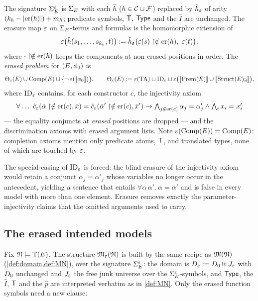 \begin{definition}
  \label{def:erased-translation}
  The signature $\Sigma_{E}^{\varepsilon}$ is $\Sigma_{E}$ with each $\hat h$
  ($h \in \mathcal{C} \cup \mathcal{F}$) replaced by $\hat h_{\varepsilon}$ of arity
  $(k_h - |\mathrm{er}(h)|) + m_h$; predicate symbols, $\mathsf{T}$, $\mathsf{Type}$ and the
  $\hat I$ are unchanged.  The erasure map $\varepsilon$ on $\Sigma_{E}$-terms and
  formulas is the homomorphic extension of
  \[
    \varepsilon\bigl(\hat h(s_1,\dots,s_{k_h}, \bar{t})\bigr) \mathrel{:=}
    \hat h_{\varepsilon}\bigl(\bar{\varepsilon(s)}\upharpoonright\notin\mathrm{er}(h),\
    \varepsilon(\bar{t})\bigr),
  \]
  where $\cdot\upharpoonright\notin\mathrm{er}(h)$ keeps the components at non-erased
  positions in order.  The \emph{erased problem} for $(E, \phi_0)$ is
  \[
    \Theta_{\varepsilon}(E) \cup \mathrm{Comp}(E) \cup \{\neg\, \varepsilon([\![ \phi_0 ]\!])\},
    \qquad
    \Theta_{\varepsilon}(E) \mathrel{:=} \varepsilon(\mathrm{TA}) \cup \mathrm{ID}_{\varepsilon} \cup
    \varepsilon\bigl([\![ \mathrm{Prem}(E) ]\!] \cup
    [\![ \mathrm{Struct}(E)_\exists ]\!]\bigr),
  \]
  where $\mathrm{ID}_{\varepsilon}$ contains, for each constructor $c$, the
  injectivity axiom
  \[
    \forall\dots\
    \hat c_{\varepsilon}(\bar{\alpha}\upharpoonright\notin\mathrm{er}(c), \bar{x}) =
    \hat c_{\varepsilon}(\bar{\alpha}'\upharpoonright\notin\mathrm{er}(c), \bar{x}') \rightarrow
    \textstyle\bigwedge_{j \notin \mathrm{er}(c)} \alpha_j = \alpha'_j \wedge
    \bigwedge_i x_i = x'_i
  \]
  --- the equality conjuncts at \emph{erased} positions are dropped ---
  and the discrimination axioms with erased argument lists.  Note
  $\varepsilon(\mathrm{Comp}(E)) = \mathrm{Comp}(E)$: completion axioms mention only predicate atoms,
  $\mathsf{T}$, and translated types, none of which are touched by $\varepsilon$.
\end{definition}

The special-casing of $\mathrm{ID}_{\varepsilon}$ is forced: the blind erasure of
the injectivity axiom would retain a conjunct $\alpha_j = \alpha'_j$
whose variables no longer occur in the antecedent, yielding a sentence
that entails $\forall \alpha\,\alpha'.\ \alpha = \alpha'$ and is false in
every model with more than one element.  Erasure removes exactly the
parameter-injectivity claims that the omitted arguments used to carry.

\subsection{The erased intended models}

Fix $\mathfrak{N} \models \mathbb{T}(E)$.  The structure $\mathfrak{M}_{\varepsilon}(\mathfrak{N})$ is built by the same recipe
as $\mathfrak{M}(\mathfrak{N})$ (\cref{def:domain,def:MN}), over the signature $\Sigma_{E}^{\varepsilon}$: the
domain is $D_{\varepsilon} \mathrel{:=} D_0 \uplus J_{\varepsilon}$ with $D_0$
unchanged and $J_{\varepsilon}$ the free junk universe over the
$\Sigma_{E}^{\varepsilon}$-symbols, and $\mathsf{Type}$, the $\hat I$, $\mathsf{T}$ and the $\hat p$ are
interpreted verbatim as in \cref{def:MN}.  Only the erased function
symbols need a new clause:

